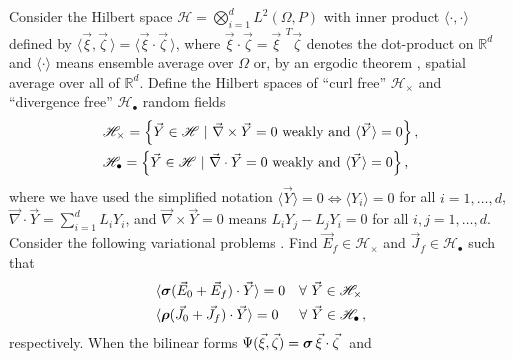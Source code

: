 \documentclass{cmslatex}
\newcommand\bsig{\mbox{\boldmath${\sigma}$}}
\newcommand\brho{\mbox{\boldmath${\rho}$}}
\begin{document}
Consider the Hilbert space $\mathscr{H}=\bigotimes_{i=1}^dL^2(\Omega,P)$ with inner
product $\langle\cdot,\cdot\rangle$ defined by $\langle\vec{\xi},\vec{\zeta}\,\rangle=\langle\vec{\xi}\cdot\vec{\zeta}\,\rangle$, where
$\vec{\xi}\cdot\vec{\zeta}=\vec{\xi}^{\;\,T}\vec{\zeta}$ denotes the dot-product 
on $\mathbb{R}^d$ and $\langle\cdot\rangle$ means ensemble average over $\Omega$ or, by an
ergodic theorem \cite{Golden:CMP-473}, spatial average over all of
${\mathbb{R}}^d$. Define the Hilbert spaces \cite{Golden:CMP-473} of
``curl free'' $\mathscr{H}_\times$ and ``divergence free''
$\mathscr{H}_{\bullet}$ random fields  
%
\begin{align}\label{eq:curlfreeHilbert}
  &\mathscr{H}_\times=
  \left\{\vec{Y}\in \mathscr{H} \ | \ \vec{\nabla} \times\vec{Y}=0 \text{ weakly and }
    \langle\vec{Y}\rangle=0
  \right\}, \\
&\mathscr{H}_{\bullet}=
\left\{\vec{Y}\in \mathscr{H} \ | \ \vec{\nabla}\cdot\vec{Y}=0 \text{ weakly and }
    \langle\vec{Y}\rangle=0\right\},\notag 
\end{align}  
%
%
where we have used the simplified notation $\langle\vec{Y}\rangle=0 \iff \langle Y_i\rangle=0$ for
all $i=1,\ldots,d$, $\vec{\nabla}\cdot\vec{Y}=\sum_{i=1}^dL_iY_i$, and $\vec{\nabla} \times\vec{Y}=0$
means $L_iY_j-L_jY_i=0$ for all $i,j=1,\ldots,d$. Consider the following
variational problems \cite{Golden:CMP-473}. Find
$\vec{E}_f\in\mathscr{H}_\times$ and $\vec{J}_f\in\mathscr{H}_\bullet$ such that     
%
\begin{align}
 \label{eq:Weak_Curl_Free_Variational_Form}
 &\langle\bsig(\vec{E}_0+\vec{E}_f)\cdot\vec{Y}\rangle=0 \quad
 \forall \  \vec{Y}\in\mathscr{H}_\times 
\\
 &\langle\brho(\vec{J}_0+\vec{J}_f)\cdot\vec{Y}\rangle=0 \quad
 \hspace{0.5em}\forall \ \vec{Y}\in\mathscr{H}_{\bullet}\,,
  \notag
\end{align}
%
respectively. When the bilinear forms
$\Psi(\vec{\xi},\vec{\zeta})=\bsig\,\vec{\xi}\cdot\vec{\zeta}\;$ and
\end{document}
